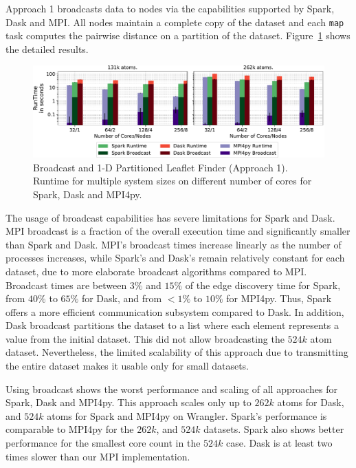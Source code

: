Approach 1 broadcasts data to nodes via the capabilities supported by Spark,
Dask and MPI. All nodes maintain a complete copy of the dataset and each
\texttt{map} task computes the pairwise distance on a partition of the dataset. 
Figure~\ref{fig:WranglerLeafLetFinderApp1} shows the detailed results.

\begin{figure}[t]
    \centering
    \includegraphics[width=.75\textwidth]{figures/data_analytics_hpc/task_par/spark_dask_lf_approach1.pdf}
    \caption{Broadcast and 1-D Partitioned Leaflet Finder (Approach 1). Runtime
    for multiple system sizes on different number of cores for Spark, Dask and
    MPI4py.}
    \label{fig:WranglerLeafLetFinderApp1}
\end{figure}

The usage of broadcast capabilities has severe limitations for Spark and Dask.
MPI broadcast is a fraction of the overall execution time and significantly
smaller than Spark and Dask. MPI's broadcast times increase linearly as the
number of processes increases, while Spark's and Dask's remain relatively
constant for each dataset, due to more elaborate broadcast algorithms compared
to MPI. Broadcast times are between $3\%$ and $15\%$ of the edge discovery time
for Spark, from $40\%$ to $65\%$ for Dask, and from $<1\%$ to $10\%$ for MPI4py.
Thus, Spark offers a more efficient communication subsystem compared to Dask. In
addition, Dask broadcast partitions the dataset to a list where each element
represents a value from the initial dataset. This did not allow broadcasting the
$524k$ atom dataset. Nevertheless, the limited scalability of this approach due
to transmitting the entire dataset makes it usable only for small datasets.

Using broadcast shows the worst performance and scaling of all approaches for
Spark, Dask and MPI4py. This approach scales only up to $262k$ atoms for Dask,
and $524k$ atoms for Spark and MPI4py on Wrangler. Spark's performance is
comparable to MPI4py for the $262k$, and $524k$ datasets. Spark
also shows better performance
for the smallest core count in the $524k$ case. Dask is at least two times
slower than our MPI implementation.

